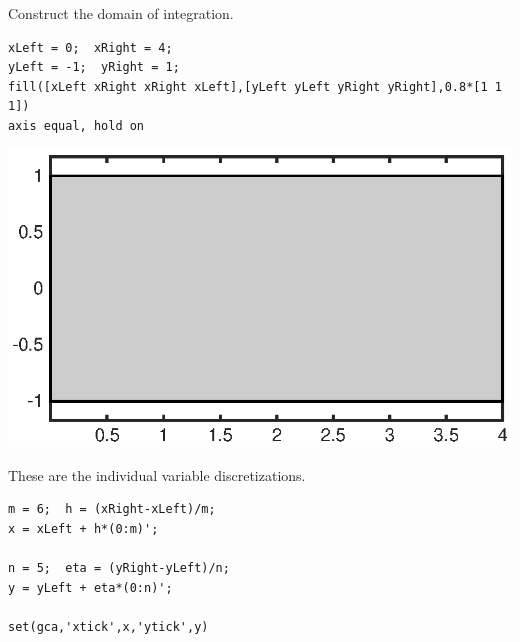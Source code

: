 











\setlength{\parindent}{0pt}



    
    \vspace{1em}\begin{par}
Construct the domain of integration.
\end{par} 
\begin{lstlisting}
xLeft = 0;  xRight = 4;
yLeft = -1;  yRight = 1;
fill([xLeft xRight xRight xLeft],[yLeft yLeft yRight yRight],0.8*[1 1 1])
axis equal, hold on
\end{lstlisting}

\includegraphics{CubatureSetup_01.eps}
\vspace{1em}\begin{par}
These are the individual variable discretizations.
\end{par} 
\begin{lstlisting}
m = 6;  h = (xRight-xLeft)/m;
x = xLeft + h*(0:m)';

n = 5;  eta = (yRight-yLeft)/n;
y = yLeft + eta*(0:n)';

set(gca,'xtick',x,'ytick',y)
\end{lstlisting}

